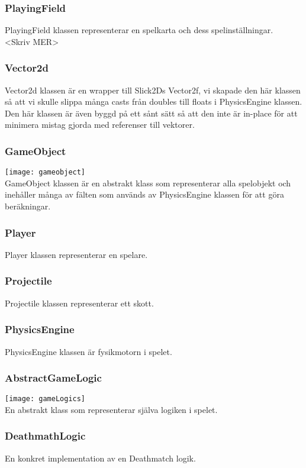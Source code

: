 \subsubsection{PlayingField}
PlayingField klassen representerar en spelkarta och dess spelinställningar.\\
<Skriv MER>\\
\subsubsection{Vector2d}
Vector2d klassen är en wrapper till Slick2Ds Vector2f, vi skapade den här klassen så att vi skulle slippa många casts från doubles till floats i PhysicsEngine klassen. Den här klassen är även byggd på ett sånt sätt så att den inte är in-place för att minimera mistag gjorda med referenser till vektorer.\\
\subsubsection{GameObject}
\texttt{[image: gameobject]}\\
GameObject klassen är en abstrakt klass som representerar alla spelobjekt och inehåller många av fälten som används av PhysicsEngine klassen för att göra beräkningar.\\
\subsubsection{Player}
Player klassen representerar en spelare.\\
\subsubsection{Projectile}
Projectile klassen representerar ett skott.\\
\subsubsection{PhysicsEngine}
PhysicsEngine klassen är fysikmotorn i spelet.\\
\subsubsection{AbstractGameLogic}
\texttt{[image: gameLogics]}\\
En abstrakt klass som representerar själva logiken i spelet.\\
\subsubsection{DeathmathLogic}
En konkret implementation av en Deathmatch logik.\\
